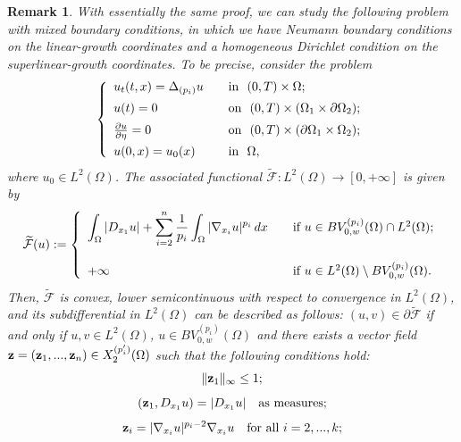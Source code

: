 \documentclass[reqno,12pt]{amsart}
\def\z{{\bf z}}
\newtheorem{remark}[theorem]{Remark}
\numberwithin{equation}{section}
\begin{document}
\begin{remark}
With essentially the same proof, we can study the following problem with mixed boundary conditions, in which we have Neumann boundary conditions on the linear-growth coordinates and a homogeneous Dirichlet condition on the superlinear-growth coordinates. To be precise, consider the problem
\begin{equation}\label{eq:mixedproblem}
\left\{ \begin{array}{lll} u_t (t,x) = \Delta_{(p_i)} u   \quad &\hbox{in} \ \ (0, T) \times \Omega; \\[5pt] u(t) = 0 \quad &\hbox{on} \ \ (0, T) \times  (\Omega_1 \times \partial\Omega_2); 
\\[5pt] \frac{\partial u}{\partial \eta} = 0 \quad &\hbox{on} \ \ (0, T) \times  (\partial\Omega_1 \times \Omega_2);
\\[5pt] u(0,x) = u_0(x) \quad & \hbox{in} \ \  \Omega, \end{array} \right.
\end{equation}
where $u_0 \in L^2(\Omega)$. The associated functional $\widetilde{\mathcal{F}}: L^2(\Omega) \rightarrow [0, + \infty]$ is given by
\begin{equation}
\widetilde{\mathcal{F}}(u):= \left\{ \begin{array}{ll} \displaystyle\int_\Omega |D_{x_1} u| + \sum_{i=2}^n \frac{1}{p_i} \int_\Omega |\nabla_{x_i} u|^{p_i} \, dx \quad &\hbox{if} \ u \in BV_{0,w}^{(p_i)}(\Omega) \cap L^2(\Omega); \\ \\ + \infty \quad &\hbox{if} \ u \in  L^2(\Omega) \setminus BV_{0,w}^{(p_i)}(\Omega).
\end{array}\right.
\end{equation}
Then, $\widetilde{\mathcal{F}}$ is convex, lower semicontinuous with respect to convergence in $L^2(\Omega)$, and its subdifferential in $L^2(\Omega)$ can be described as follows: $(u,v) \in \partial\widetilde{\mathcal{F}}$ if and only if $u, v \in L^2(\Omega)$, $u \in BV_{0,w}^{(p_i)}(\Omega)$ and there exists a vector field $\z = (\z_1, ..., \z_n) \in X^{(p'_i)}_2(\Omega)$ such that the following conditions hold:
\begin{equation} 
\| \z_1 \|_\infty \leq 1;
\end{equation}
\begin{equation}
(\z_1, D_{x_1} u) = |D_{x_1} u| \quad \hbox{as measures};
\end{equation}
\begin{equation} 
\z_i = |\nabla_{x_i} u|^{p_i - 2} \nabla_{x_i} u \quad \hbox{for all } i = 2,...,k;

\end{equation}
\end{remark}
\end{document}
